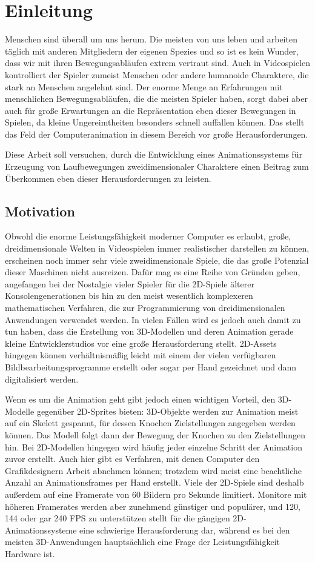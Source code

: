 \chapter{Einleitung}
Menschen sind überall um uns herum. Die meisten von uns leben und arbeiten täglich mit anderen Mitgliedern der eigenen Spezies und so ist es kein Wunder, dass wir mit ihren Bewegungsabläufen extrem vertraut sind. Auch in Videospielen kontrolliert der Spieler zumeist Menschen oder andere humanoide Charaktere, die stark an Menschen angelehnt sind. Der enorme Menge an Erfahrungen mit menschlichen Bewegungsabläufen, die die meisten Spieler haben, sorgt dabei aber auch für große Erwartungen an die Repräsentation eben dieser Bewegungen in Spielen, da kleine Ungereimtheiten besonders schnell auffallen können. Das stellt das Feld der Computeranimation in diesem Bereich vor große Herausforderungen.

Diese Arbeit soll versuchen, durch die Entwicklung eines Animationssystems für Erzeugung von Laufbewegungen zweidimensionaler Charaktere einen Beitrag zum Überkommen eben dieser Herausforderungen zu leisten.

\section{Motivation}
Obwohl die enorme Leistungsfähigkeit moderner Computer es erlaubt, große, dreidimensionale Welten in Videospielen immer realistischer darstellen zu können, erscheinen noch immer sehr viele zweidimensionale Spiele, die das große Potenzial dieser Maschinen nicht ausreizen. Dafür mag es eine Reihe von Gründen geben, angefangen bei der Nostalgie vieler Spieler für die 2D-Spiele älterer Konsolengenerationen bis hin zu den meist wesentlich komplexeren mathematischen Verfahren, die zur Programmierung von dreidimensionalen Anwendungen verwendet werden. In vielen Fällen wird es jedoch auch damit zu tun haben, dass die Erstellung von 3D-Modellen und deren Animation gerade kleine Entwicklerstudios vor eine große Herausforderung stellt. 2D-Assets hingegen können verhältnismäßig leicht mit einem der vielen verfügbaren Bildbearbeitungsprogramme erstellt oder sogar per Hand gezeichnet und dann digitalisiert werden.

Wenn es um die Animation geht gibt jedoch einen wichtigen Vorteil, den 3D-Modelle gegenüber 2D-Sprites bieten: 3D-Objekte werden zur Animation meist auf ein Skelett gespannt, für dessen Knochen Zielstellungen angegeben werden können. Das Modell folgt dann der Bewegung der Knochen zu den Zielstellungen hin. Bei 2D-Modellen hingegen wird häufig jeder einzelne Schritt der Animation zuvor erstellt. Auch hier gibt es Verfahren, mit denen Computer den Grafikdesignern Arbeit abnehmen können; trotzdem wird meist eine beachtliche Anzahl an Animationsframes per Hand erstellt. Viele der 2D-Spiele sind deshalb außerdem auf eine Framerate von 60 Bildern pro Sekunde limitiert. Monitore mit höheren Framerates werden aber zunehmend günstiger und populärer, und 120, 144 oder gar 240 FPS zu unterstützen stellt für die gängigen 2D-Animationssysteme eine schwierige Herausforderung dar, während es bei den meisten 3D-Anwendungen hauptsächlich eine Frage der Leistungsfähigkeit Hardware ist.

